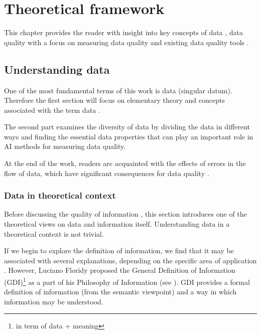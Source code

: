 \chapter{Theoretical framework}
\label{ch:theoretical_framework}
	
	This chapter provides the reader with insight into key concepts of data , data quality with a focus on measuring data quality  and existing data quality tools . 

    \section{Understanding data}
   	\label{sec:understanding_data}
   	
		One of the most fundamental terms of this work is data (singular datum). Therefore the first section will focus on elementary theory and concepts associated with the term data .
			
		The second part examines the diversity of data  by dividing the data in different ways and finding the essential data properties that can play an important role in AI methods for measuring data quality.

		At the end of the work, readers are acquainted with the effects of errors in the flow of data, which have significant consequences for data quality .
   
    	\subsection{Data in theoretical context}
    	\label{sec:data_in_theoretical_context}
    	
			Before discussing the quality of information , this section introduces one of the theoretical views on data and information itself. Understanding data in a theoretical context is not trivial.  
			
			If we begin to explore the definition of information, we find that it may be associated with several explanations, depending on the specific area of application \cite{Zins2007}. However, Luciano Floridy proposed the General Definition of Information (GDI)\footnote{in term of data + meaning} as a part of his Philosophy of Information (see \cite{Floridi2013}). GDI provides a formal definition of information (from the semantic viewpoint) and a way in which information may be understood. 
			

